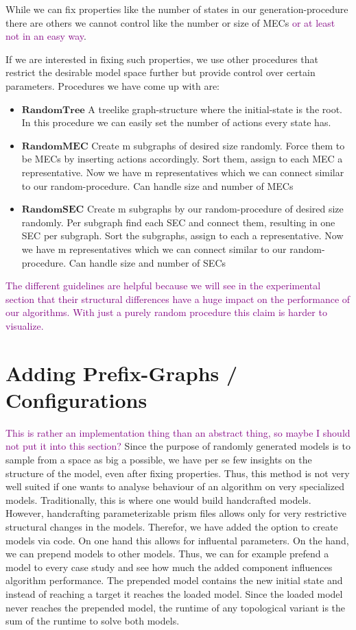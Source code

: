 While we can fix properties like the number of states in our generation-procedure there are others we cannot control like the number or size of MECs \textcolor{purple}{or at least not in an easy way}.

If we are interested in fixing such properties, we use other procedures that restrict the desirable model space further but provide control over certain parameters. Procedures we have come up with are:
\begin{itemize}
\item $\textbf{RandomTree}$ A treelike graph-structure where the initial-state is the root. In this procedure we can easily set the number of actions every state has.
\item $\textbf{RandomMEC}$ Create m subgraphs of desired size randomly. Force them to be MECs by inserting actions accordingly. Sort them, assign to each MEC a representative. Now we have m representatives which we can connect similar to our random-procedure. Can handle size and number of MECs
\item $\textbf{RandomSEC}$ Create m subgraphs by our random-procedure of desired size randomly. Per subgraph find each SEC and connect them, resulting in one SEC per subgraph. Sort the subgraphs, assign to each a representative. Now we have m representatives which we can connect similar to our random-procedure. Can handle size and number of SECs
\end{itemize}

\textcolor{purple}{The different guidelines are helpful because we will see in the experimental section that their structural differences have a huge impact on the performance of our algorithms. With just a purely random procedure this claim is harder to visualize.}

\section{Adding Prefix-Graphs / Configurations}
\textcolor{purple}{This is rather an implementation thing than an abstract thing, so maybe I should not put it into this section?}
Since the purpose of randomly generated models is to sample from a space as big a possible, we have per se few insights on the structure of the model, 
even after fixing properties. Thus, this method is not very well suited if one wants to analyse behaviour of an algorithm on very specialized models. 
Traditionally, this is where one would build handcrafted models. 
However, handcrafting parameterizable prism files allows only for very restrictive structural changes in the models. 
Therefor, we have added the option to create models via code. On one hand this allows for influental parameters. On the hand, we can prepend models to 
other models. Thus, we can for example prefend a model to every case study and see how much the added component influences algorithm performance.
The prepended model contains the new initial state and instead of reaching a target it reaches the loaded model.
Since the loaded model never reaches the prepended model, the runtime of any topological variant is the sum of the runtime to solve both models.

